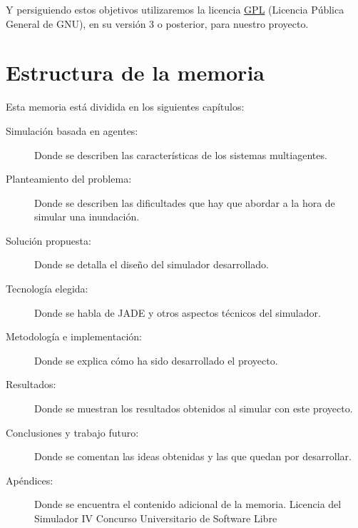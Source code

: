 Y persiguiendo estos objetivos utilizaremos la licencia \hyperref[ap1]{GPL}
(Licencia Pública General de GNU), en su versión 3 o posterior, para nuestro
proyecto.

\section{Estructura de la memoria}

Esta memoria está dividida en los siguientes capítulos:

\begin{description}
 \item[Simulación basada en agentes:] Donde se describen las características de
los sistemas multiagentes.
 \item[Planteamiento del problema:] Donde se describen las dificultades que hay
que abordar a la hora de simular una inundación.
 \item[Solución propuesta:] Donde se detalla el diseño del simulador
desarrollado.
 \item[Tecnología elegida:] Donde se habla de JADE y otros aspectos
técnicos del simulador.
 \item[Metodología e implementación:] Donde se explica cómo ha sido desarrollado
el proyecto.
 \item[Resultados:] Donde se muestran los resultados obtenidos al simular con
este proyecto.
 \item[Conclusiones y trabajo futuro:] Donde se comentan las ideas obtenidas y
las que quedan por desarrollar.
 \item[Apéndices:] Donde se encuentra el contenido adicional de la memoria.
  \subitem Licencia del Simulador
  \subitem IV Concurso Universitario de Software Libre
\end{description}

